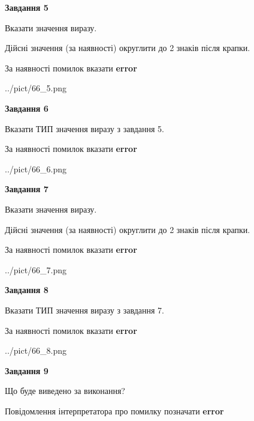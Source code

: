 \documentclass[11pt, ukrainian]{article}
\begin{document}
{\begin {large}
{\begin {center}\textbf{Завдання 5}\end {center}}\par
Вказати значення виразу. \par
Дійсні значення (за наявності) округлити до 2 знаків після крапки. \par
За наявності помилок вказати \textbf{error}

\begin{center}
	{../pict/66_5.png}
\end{center}
\newpage

{\begin {center}\textbf{Завдання 6}\end {center}}\par
Вказати ТИП значення виразу з завдання 5. \par
За наявності помилок вказати \textbf{error}

\begin{center}
	{../pict/66_6.png}
\end{center}
\newpage

{\begin {center}\textbf{Завдання 7}\end {center}}\par
Вказати значення виразу. \par
Дійсні значення (за наявності) округлити до 2 знаків після крапки. \par
За наявності помилок вказати \textbf{error}

\begin{center}
	{../pict/66_7.png}
\end{center}
\newpage

{\begin {center}\textbf{Завдання 8}\end {center}}\par
Вказати ТИП значення виразу з завдання 7. \par
За наявності помилок вказати \textbf{error}

\begin{center}
	{../pict/66_8.png}
\end{center}
\newpage

{\begin {center}\textbf{Завдання 9}\end {center}}\par
Що буде виведено за виконання? \par
Повідомлення інтерпретатора про помилку позначати \textbf{error}


\end{large}}
\end{document}
